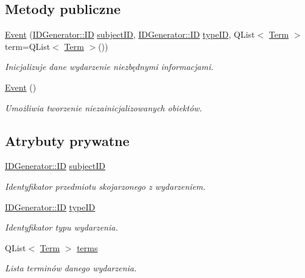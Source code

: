 \subsection*{Metody publiczne}
\begin{DoxyCompactItemize}
\item 
\hyperlink{classEvent_acd3992dc833e31573a209ba44910b57f}{Event} (\hyperlink{classIDGenerator_1_1ID}{IDGenerator::ID} \hyperlink{classEvent_a584a3fce37eaa31ee45c202a538f59b6}{subjectID}, \hyperlink{classIDGenerator_1_1ID}{IDGenerator::ID} \hyperlink{classEvent_a8abdf6e037043e6d6d761de593d33807}{typeID}, QList$<$ \hyperlink{classTerm}{Term} $>$ term=QList$<$ \hyperlink{classTerm}{Term} $>$())
\begin{DoxyCompactList}\small\item\em Inicjalizuje dane wydarzenie niezbędnymi informacjami. \item\end{DoxyCompactList}\item 
\hyperlink{classEvent_a5a40dd4708297f7031e29b39e039ae10}{Event} ()
\begin{DoxyCompactList}\small\item\em Umożliwia tworzenie niezainicjalizowanych obiektów. \item\end{DoxyCompactList}\end{DoxyCompactItemize}
\subsection*{Atrybuty prywatne}
\begin{DoxyCompactItemize}
\item 
\hyperlink{classIDGenerator_1_1ID}{IDGenerator::ID} \hyperlink{classEvent_a584a3fce37eaa31ee45c202a538f59b6}{subjectID}
\begin{DoxyCompactList}\small\item\em Identyfikator przedmiotu skojarzonego z wydarzeniem. \item\end{DoxyCompactList}\item 
\hyperlink{classIDGenerator_1_1ID}{IDGenerator::ID} \hyperlink{classEvent_a8abdf6e037043e6d6d761de593d33807}{typeID}
\begin{DoxyCompactList}\small\item\em Identyfikator typu wydarzenia. \item\end{DoxyCompactList}\item 
QList$<$ \hyperlink{classTerm}{Term} $>$ \hyperlink{classEvent_aff6cf909022d62edc3b633281d3121a6}{terms}
\begin{DoxyCompactList}\small\item\em Lista terminów danego wydarzenia. \item\end{DoxyCompactList}\end{DoxyCompactItemize}
